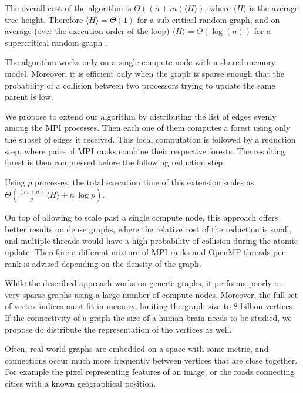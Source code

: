 The overall cost of the algorithm is $\Theta((n +
m)\langle H \rangle)$, where $\langle H \rangle$
is the average tree height. Therefore $\langle H \rangle = \Theta(1)$ for a sub-critical random graph,
and on average (over the execution order of the loop) $\langle H
\rangle = \Theta(\log(n))$
for a supercritical random graph \cite{RandomGraph}.

The algorithm \label{algorithm:cc2} works only on a single compute node with a shared memory model.
Moreover, it is efficient
only when the graph is sparse enough that the
probability of a collision between two processors
trying to update the same parent is low.

We propose to extend our algorithm by distributing the list of edges evenly among the MPI
processes. %
Then each one of them computes a forest using only the subset of edges it
received. This local
computation
is followed by a reduction step, where pairs of MPI ranks combine their respective
forests.
The resulting forest is then compressed before the following reduction step.

Using $p$ processes, the total execution time of this extension scales as $\Theta(\frac{(m +
n)}{p}\, \langle H \rangle + n\,\log p)$.

On top of allowing to scale past a single compute node, this approach offers better results on
dense graphs, where the relative cost of the reduction is small, and multiple threads would have
a high probability of collision during the atomic update.
Therefore a different mixture of MPI ranks and OpenMP threads per rank is advised depending on the
density of the graph.

\label{section:distributed}
While the described approach works on generic graphs, it performs poorly on very sparse graphs using
a large number of compute nodes. Moreover, the full set of vertex indices must fit in memory, limiting
the graph size to $8$ billion vertices. If the connectivity of a graph the size of a human brain needs
to be studied,
we propose do distribute the representation of the vertices as well.

Often, real world graphs are embedded on a space with some metric, and connections
occur much more frequently between
vertices that are close together. For example the pixel representing features of an
image, or the roads connecting cities
with a known geographical position.

